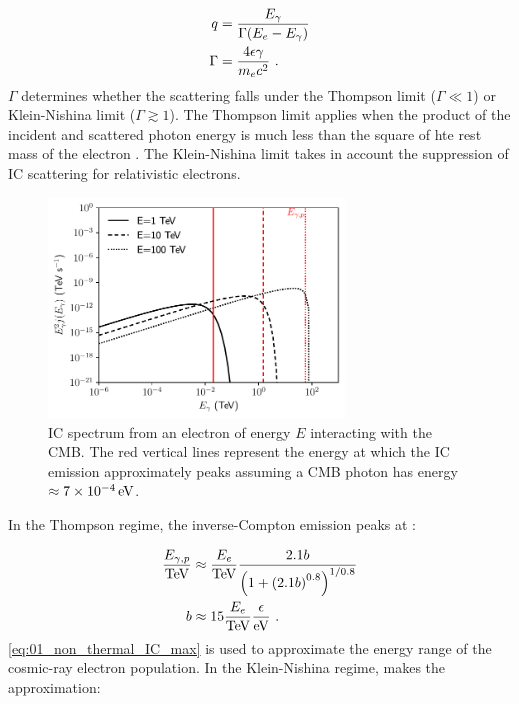 \begin{subequations}
    \begin{align}
        q&=\frac{E_\gamma}{\Gamma\qty(E_e-E_\gamma)} \\
        \Gamma&=\frac{4\epsilon\gamma}{m_ec^2}\text{ .}
    \end{align}
\end{subequations}
\noindent $\Gamma$ determines whether the scattering falls under the Thompson limit ($\Gamma \ll 1$) or Klein-Nishina limit ($\Gamma \gtrsim 1$). The Thompson limit applies when the product of the incident and scattered photon energy is much less than the square of hte rest mass of the electron \citep{RevModPhys.42.237}. The Klein-Nishina limit  takes in account the suppression of IC scattering for relativistic electrons.
\begin{figure}
    \centering
    \includegraphics[width=0.7\textwidth]{04_Introduction/Images/non_thermal_emission/IC_spectrum.pdf}
    \caption{IC spectrum from an electron of energy $E$ interacting with the CMB.  The red vertical lines represent the energy at which the IC emission approximately peaks assuming a CMB photon has energy $\approx 7\times 10^{-4}\,\si{\electronvolt}$.}
    \label{fig:01_IC_flux}
\end{figure}
\newpar
In the Thompson regime, the inverse-Compton emission peaks at \citep{2009ARA&A..47..523H}:

\begin{equation}
	\begin{split}
		\frac{E_{\gamma,p}}{\TeV}&\approx \frac{E_e}{\TeV}\frac{2.1b}{\qty(1+\qty(2.1b)^{0.8})^{1/0.8}} \\
		b&\approx 15\frac{E_e}{\TeV}\frac{\epsilon}{\eV}\text{ .}
	\end{split} \label{eq:01_non_thermal_IC_max}
\end{equation}
\noindent \autoref{eq:01_non_thermal_IC_max} is used to approximate the energy range of the cosmic-ray electron population. In the Klein-Nishina regime, \cite{doi:10.1126/science.abg5137} makes the approximation:

